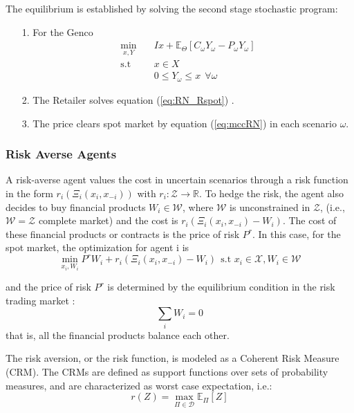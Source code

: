 \documentclass[11pt, letterpaper]{article}
\begin{document}
The equilibrium is established by solving the second stage stochastic program:

\begin{itemize}
    \item[1.] For the Genco
        \begin{align}
             \min_{x,Y} & \quad Ix + \mathbb{E}_{\Theta}[C_\omega Y_\omega - P_\omega Y_\omega] \\
             \textrm{s.t} & \quad  x \in X\\
                          & \quad  0 \leq Y_\omega \leq x  \ \ \forall \omega
            \end{align}
    \item[2.] The Retailer solves equation (\ref{eq:RN_Rspot}) .
    \item[3.] The price clears spot market by equation (\ref{eq:mccRN}) in each scenario $\omega$.


\end{itemize}

\subsubsection{Risk Averse Agents}\label{sec:RN}

A risk-averse agent values the cost in uncertain scenarios through a risk function in the form $r_i(\Xi_i(x_i,x_{-i}))$ with $r_i: \mathcal{Z} \rightarrow \mathbb{R}$. To hedge the risk, the agent also decides to buy financial products $W_i \in \mathcal{W}$, where $\mathcal{W}$ is unconstrained in $\mathcal{Z}$, (i.e., $\mathcal{W}=\mathcal{Z}$ complete market) and the cost is $r_i(\Xi_i(x_i,x_{-i}) - W_i)$. The cost of these financial products or contracts is the price of risk $P^{r}$.  
In this case, for the spot market, the optimization for agent i is 
\begin{equation}
    \min_{x_i, W_i} P^{r} W_i + r_i(\Xi_i(x_i,x_{-i}) - W_i) \ \ \textrm{s.t \ \ \ } x_i \in \mathcal{X}, W_i \in \mathcal{W}
\end{equation}

and the price of risk $P^r$ is determined by the equilibrium condition in the risk trading market :
\begin{equation}
    \sum_i W_i =0
\end{equation}
that is, all the financial products balance each other.

The risk aversion, or the risk function, is modeled as a Coherent Risk Measure (CRM). The CRMs are defined as support functions over sets of probability measures, and are characterized as worst case expectation, i.e.: 
\begin{equation}
    r(Z) = \max_{\Pi \in \mathcal{D}} \mathbb{E}_\Pi [Z]
\end{equation}
\end{document}
